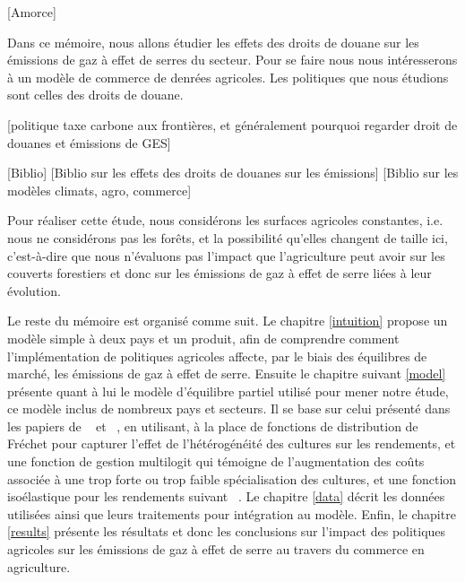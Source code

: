 [Amorce]

Dans ce mémoire, nous allons étudier les effets des droits de douane sur les émissions de gaz à effet de serres du secteur. Pour se faire nous nous intéresserons à un modèle de commerce de denrées agricoles. Les politiques que nous étudions sont celles des droits de douane.

    [politique taxe carbone aux frontières, et généralement pourquoi regarder droit de douanes et émissions de GES]

    [Biblio]
    [Biblio sur les effets des droits de douanes sur les émissions]
    [Biblio sur les modèles climats, agro, commerce]


Pour réaliser cette étude, nous considérons les surfaces agricoles constantes, i.e. nous ne considérons pas les forêts, et la possibilité qu’elles changent de taille ici, c’est-à-dire que nous n’évaluons pas l’impact que l’agriculture peut avoir sur les couverts forestiers et donc sur les émissions de gaz à effet de serre liées à leur évolution.

Le reste du mémoire est organisé comme suit. Le chapitre \ref{intuition} propose un modèle simple à deux pays et un produit, afin de comprendre comment l’implémentation de politiques agricoles affecte, par le biais des équilibres de marché, les émissions de gaz à effet de serre. Ensuite le chapitre suivant \ref{model} présente quant à lui le modèle d’équilibre partiel utilisé pour mener notre étude, ce modèle inclus de nombreux pays et secteurs. Il se base sur celui présenté dans les papiers de ~\cite{Gouel2021} et ~\cite{Gouel2025}, en utilisant, à la place de fonctions de distribution de Fréchet pour capturer l’effet de l’hétérogénéité des cultures sur les rendements, et une fonction de gestion multilogit qui témoigne de l’augmentation des coûts associée à une trop forte ou trop faible spécialisation des cultures, et une fonction isoélastique pour les rendements suivant ~\cite{Carpentier2013}. Le chapitre \ref{data} décrit les données utilisées ainsi que leurs traitements pour intégration au modèle. Enfin, le chapitre \ref{results} présente les résultats et donc les conclusions sur l’impact des politiques agricoles sur les émissions de gaz à effet de serre au travers du commerce en agriculture.
